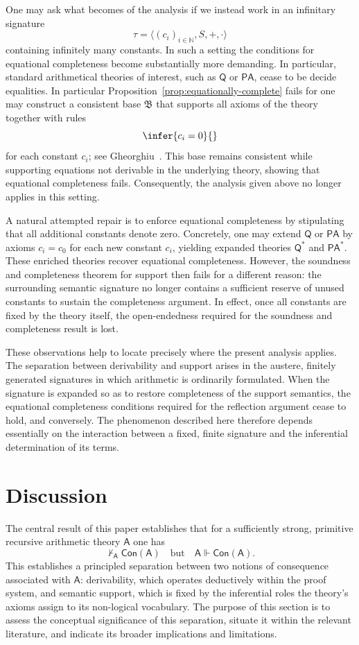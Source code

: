 \documentclass[reqno]{asl}
\newcommand{\base}[1]{\mathfrak{#1}}
\newcommand{\pa}{\textsf{A}}
\newcommand{\Con}{\textsf{Con}}
\begin{document}
One may ask what becomes of the analysis if we instead work in an infinitary signature
\[
\tau=\langle (c_i)_{i\in\mathbb{N}}, S,+,\cdot\rangle
\]
containing infinitely many constants. In such a setting the conditions for equational completeness become substantially more demanding. In particular, standard arithmetical theories of interest, such as $\mathsf{Q}$ or $\mathsf{PA}$, cease to be decide equalities. In particular Proposition~\ref{prop:equationally-complete} fails for one may construct a consistent base $\base{B}$ that supports all axioms of the theory together with rules
\[
\infer{c_i=0}{}
\]
for each constant $c_i$; see Gheorghiu~\cite{gheorghiu2026arithemtic}. This base remains consistent while supporting equations not derivable in the underlying theory, showing that equational completeness fails. Consequently, the analysis given above no longer applies in this setting.

A natural attempted repair is to enforce equational completeness by stipulating that all additional constants denote zero. Concretely, one may extend $\mathsf{Q}$ or $\mathsf{PA}$ by axioms $c_i=c_0$ for each new constant $c_i$, yielding expanded theories $\mathsf{Q}^\ast$ and $\mathsf{PA}^\ast$. These enriched theories recover equational completeness. However, the soundness and completeness theorem for support then fails for a different reason: the surrounding semantic signature no longer contains a sufficient reserve of unused constants to sustain the completeness argument. In effect, once all constants are fixed by the theory itself, the open-endedness required for the soundness and completeness result is lost.

These observations help to locate precisely where the present analysis applies. The separation between derivability and support arises in the austere, finitely generated signatures in which arithmetic is ordinarily formulated. When the signature is expanded so as to restore completeness of the support semantics, the equational completeness conditions required for the reflection argument cease to hold, and conversely. The phenomenon described here therefore depends essentially on the interaction between a fixed, finite signature and the inferential determination of its terms.

\section{Discussion} \label{sec:discussion}

The central result of this paper establishes that for a sufficiently strong,
primitive recursive arithmetic theory $\pa$ one has
\[
  \not\vdash_{\pa} \Con(\pa) \quad \text{but} \quad \pa \Vdash \Con(\pa).
\]
This establishes a principled separation between two notions of consequence
associated with $\pa$: derivability, which operates deductively within the proof
system, and semantic support, which is fixed by the inferential roles the
theory's axioms assign to its non-logical vocabulary. The purpose of this
section is to assess the conceptual significance of this separation, situate it
within the relevant literature, and indicate its broader implications and
limitations.
\end{document}

